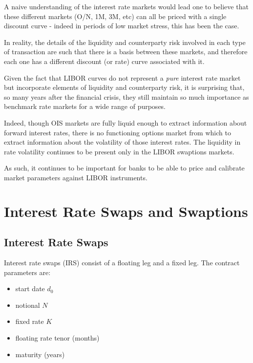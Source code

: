 \documentclass[11pt]{article}
\providecommand{\tightlist}{%
      \setlength{\itemsep}{0pt}\setlength{\parskip}{0pt}}
\begin{document}
    A naive understanding of the interest rate markets would lead one to
believe that these different markets (O/N, 1M, 3M, etc) can all be
priced with a single discount curve - indeed in periods of low market
stress, this has been the case.

In reality, the details of the liquidity and counterparty risk involved
in each type of transaction are such that there is a basis between these
markets, and therefore each one has a different discount (or rate) curve
associated with it.

    Given the fact that LIBOR curves do not represent a \emph{pure} interest
rate market but incorporate elements of liquidity and counterparty risk,
it is surprising that, so many years after the financial crisis, they
still maintain so much importance as benchmark rate markets for a wide
range of purposes.

Indeed, though OIS markets are fully liquid enough to extract
information about forward interest rates, there is no functioning
options market from which to extract information about the volatility of
those interest rates. The liquidity in rate volatility continues to be
present only in the LIBOR swaptions markets.

As such, it continues to be important for banks to be able to price and
calibrate market parameters against LIBOR instruments.

    \hypertarget{interest-rate-swaps-and-swaptions}{%
\section{Interest Rate Swaps and
Swaptions}\label{interest-rate-swaps-and-swaptions}}

    \hypertarget{interest-rate-swaps}{%
\subsection{Interest Rate Swaps}\label{interest-rate-swaps}}

Interest rate swaps (IRS) consist of a floating leg and a fixed leg. The
contract parameters are:

\begin{itemize}
\tightlist
\item
  start date \(d_0\)
\item
  notional \(N\)
\item
  fixed rate \(K\)
\item
  floating rate tenor (months)
\item
  maturity (years)
\end{itemize}
\end{document}
